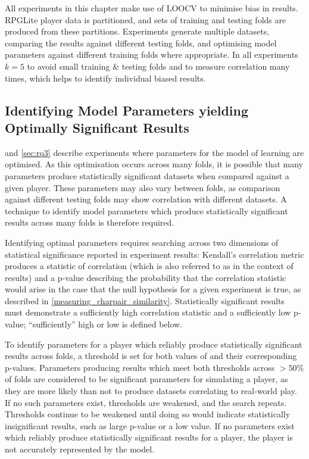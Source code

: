 All experiments in this chapter make use of LOOCV to minimise bias in results.
RPGLite player data is partitioned, and sets of training and testing folds are
produced from these partitions. Experiments generate multiple datasets,
comparing the results against different testing folds, and optimising model
parameters against different training folds where appropriate. In all
experiments \(k = 5\) to avoid small training \& testing folds and to measure
correlation many times, which helps to identify individual biased results.


\subsection{Identifying Model Parameters yielding Optimally Significant Results}
\label{identifying-significant-results-explanation}

 and \cref{sec:rq3} describe experiments where parameters for the
model of learning are optimised. As this optimisation occurs across many folds,
it is possible that many parameters produce statistically significant datasets
when compared against a given player. These parameters may also vary between
folds, as comparison against different testing folds may show correlation with
different datasets. A technique to identify model parameters which produce
statistically significant results across many folds is therefore required.

Identifying optimal parameters requires searching across two dimensions of
statistical significance reported in experiment results: Kendall's \tau{}
correlation metric produces a statistic of correlation (which is also referred
to as \tau{} in the context of results) and a p-value describing the probability
that the correlation statistic would arise in the case that the null hypothesis
for a given experiment is true, as described in
\cref{measuring_charpair_similarity}. Statistically significant results must
demonstrate a sufficiently high correlation statistic and a sufficiently low
p-value; ``sufficiently'' high or low is defined below.

To identify parameters for a player which reliably produce statistically
significant results across folds, a threshold is set for both values of \tau{}
and their corresponding p-values. Parameters producing results which meet both
thresholds across $>50\%$ of folds are considered to be significant
parameters for simulating a player, as they are more likely than not to produce
datasets correlating to real-world play. If no such parameters exist,
thresholds are weakened, and the search repeats. Thresholds continue to be
weakened until doing so would indicate statistically insignificant results, such
as large p-value or a low \tau{} value. If no parameters exist which reliably
produce statistically significant results for a player, the player is not
accurately represented by the model.

